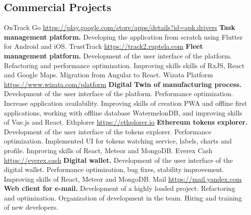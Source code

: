 \documentclass[11pt,a4paper]{moderncv}
\begin{document}
  \subsection{Commercial Projects}
  \cvline
    {OnTrack Go}
    {\url{https://play.google.com/store/apps/details?id=apk.drivers}\newline{}
    \textbf{Task management platform.}\newline{}
    Developing the application from scratch using Flutter for Android and iOS.}
  \cvline
    {TrustTrack}
    {\url{https://track2.ruptela.com}\newline{}
    \textbf{Fleet management platform.}\newline{}
    Development of the user interface of the platform. Refactoring and performance optimization.
    Improving skills skills of RxJS, React and Google Maps. Migration from Angular to React.}
  \cvline
    {Wizata Platform}
    {\url{https://www.wizata.com/platform}\newline{}
    \textbf{Digital Twin of manufacturing process.}\newline{}
    Development of the user interface of the platform. Performance optimization. Increase application availability.
    Improving skills of creation PWA and offline first applications, working with offline database WatermelonDB, and improving skills of Vue.js and React.}
  \cvline
    {Ethplorer}
    {\url{https://ethplorer.io}\newline{}
    \textbf{Ethereum tokens explorer.}\newline{}
    Development of the user interface of the tokens explorer. Performance optimization. Implemented UI for tokens watching service, labels, charts and profile.\newline{}
    Improving skills of React, Meteor and MongoDB.}
  \cvline
    {Everex Cash}
    {\url{https://everex.cash}\newline{}
    \textbf{Digital wallet.}\newline{}
    Development of the user interface of the digital wallet. Performance optimization, bug fixes, stability improvement.
    Improving skills of React, Meteor and MongoDB.}
  \cvline
    {Mail}
    {\url{https://mail.yandex.com}\newline{}
    \textbf{Web client for e-mail.}\newline{}
    Development of a highly loaded project. Refactoring and optimization.\newline{}
    Organization of development in the team. Hiring and training of new developers.}
\end{document}
